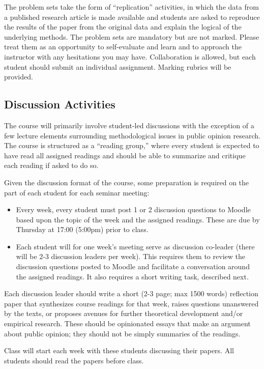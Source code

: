 \documentclass[12pt,a4paper]{article}
\begin{document}
The problem sets take the form of ``replication'' activities, in which the data from a published research article is made available and students are asked to reproduce the results of the paper from the original data and explain the logical of the underlying methods. The problem sets are mandatory but are not marked. Please treat them as an opportunity to self-evaluate and learn and to approach the instructor with any hesitations you may have. Collaboration is allowed, but each student should submit an individual assignment. Marking rubrics will be provided.

\subsection{Discussion Activities}

The course will primarily involve student-led discussions with the exception of a few lecture elements surrounding methodological issues in public opinion research. The course is structured as a ``reading group,'' where every student is expected to have read all assigned readings and should be able to summarize and critique each reading if asked to do so.

Given the discussion format of the course, some preparation is required on the part of each student for each seminar meeting:

\begin{itemize}
\item Every week, every student must post 1 or 2 discussion questions to Moodle based upon the topic of the week and the assigned readings. These are due by Thursday at 17:00 (5:00pm) prior to class.
\item Each student will for one week's meeting serve as discussion co-leader (there will be 2-3 discussion leaders per week). This requires them to review the discussion questions posted to Moodle and facilitate a conversation around the assigned readings. It also requires a short writing task, described next. 
\end{itemize}

Each discussion leader should write a short (2-3 page; max 1500 words) reflection paper that synthesizes course readings for that week, raises questions unanswered by the texts, or proposes avenues for further theoretical development and/or empirical research. These should be opinionated essays that make an argument about public opinion; they should not be simply summaries of the readings.

Class will start each week with these students discussing their papers. All students should read the papers before class.
\end{document}
